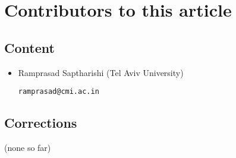 \chapter*{Contributors to this article}

\section*{Content}

\begin{itemize}
\item Ramprasad Saptharishi (Tel Aviv University)

\texttt{ramprasad@cmi.ac.in}
\end{itemize}

\section*{Corrections}

(none so far)







